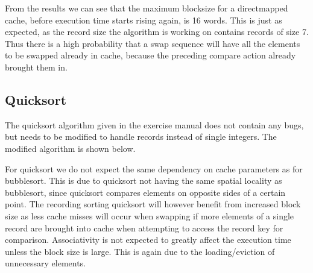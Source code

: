 From the results we can see that the maximum blocksize for a directmapped cache, before execution time starts rising again, is 
16 words. This is just as expected, as the record size the algorithm is working on contains records of size 7.
Thus there is a high probability that a swap sequence will have all the elements to be swapped already in cache,
because the preceding compare action already brought them in.

\subsection{Quicksort}
The quicksort algorithm given in the exercise manual does not contain any bugs, but needs to be modified to handle records instead
of single integers. The modified algorithm is shown below.

For quicksort we do not expect the same dependency on cache parameters as for bubblesort. This is due to quicksort not 
having the same spatial locality as bubblesort, since quicksort compares elements on opposite sides of a certain point. 
The recording sorting quicksort will however benefit from increased block size as less cache misses will occur when swapping if
more elements of a single record are brought into cache when attempting to access the record key for comparison. Associativity is
not expected to greatly affect the execution time unless the block size is large. This is again due to the loading/eviction of 
unnecessary elements.

